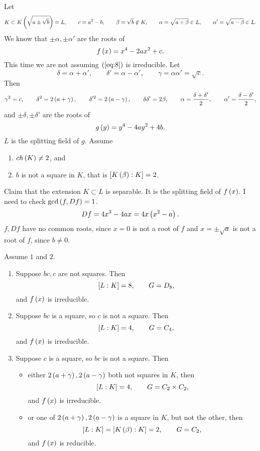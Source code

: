 Let
$$ K \subset K\rb{\sqrt{a \pm \sqrt{b}}} = L, \qquad c = a^2 - b, \qquad \beta = \sqrt{b} \notin K, \qquad \alpha = \sqrt{a + \beta} \in L, \qquad \alpha' = \sqrt{a - \beta} \in L. $$
We know that $ \pm\alpha, \pm\alpha' $ are the roots of
\begin{equation}
\label{eq:8}
f\rb{x} = x^4 - 2ax^2 + c.
\end{equation}
This time we are not assuming $ \rb{\ref{eq:8}} $ is irreducible. Let
$$ \delta = \alpha + \alpha', \qquad \delta' = \alpha - \alpha', \qquad \gamma = \alpha\alpha' = \sqrt{c}. $$
Then
$$ \gamma^2 = c, \qquad \delta^2 = 2\rb{a + \gamma}, \qquad \delta'^2 = 2\rb{a - \gamma}, \qquad \delta\delta' = 2\beta, \qquad \alpha = \dfrac{\delta + \delta'}{2}, \qquad \alpha' = \dfrac{\delta - \delta'}{2}, $$
and $ \pm\delta, \pm\delta' $ are the roots of
$$ g\rb{y} = y^4 - 4ay^2 + 4b. $$
$ L $ is the splitting field of $ g $. Assume
\begin{enumerate}
\item $ ch\rb{K} \ne 2 $, and
\item $ b $ is not a square in $ K $, that is $ \sb{K\rb{\beta} : K} = 2 $.
\end{enumerate}
Claim that the extension $ K \subset L $ is separable. It is the splitting field of $ f\rb{x} $. I need to check $ \gcd\rb{f, Df} = 1 $.
$$ Df = 4x^3 - 4ax = 4x\rb{x^2 - a}. $$
$ f, Df $ have no common roots, since $ x = 0 $ is not a root of $ f $ and $ x = \pm\sqrt{a} $ is not a root of $ f $, since $ b \ne 0 $.

\begin{theorem}
\label{thm:biquadratic}
Assume $ 1 $ and $ 2 $.
\begin{enumerate}
\item Suppose $ bc, c $ are not squares. Then
$$ \sb{L : K} = 8, \qquad G = D_8, $$
and $ f\rb{x} $ is irreducible.
\item Suppose $ bc $ is a square, so $ c $ is not a square. Then
$$ \sb{L : K} = 4, \qquad G = C_4, $$
and $ f\rb{x} $ is irreducible.
\item Suppose $ c $ is a square, so $ bc $ is not a square. Then
\begin{itemize}
\item either $ 2\rb{a + \gamma}, 2\rb{a - \gamma} $ both not squares in $ K $, then
$$ \sb{L : K} = 4, \qquad G = C_2 \times C_2, $$
and $ f\rb{x} $ is irreducible.
\item or one of $ 2\rb{a + \gamma}, 2\rb{a - \gamma} $ is a square in $ K $, but not the other, then
$$ \sb{L : K} = \sb{K\rb{\beta} : K} = 2, \qquad G = C_2, $$
and $ f\rb{x} $ is reducible.
\end{itemize}
\end{enumerate}
\end{theorem}

